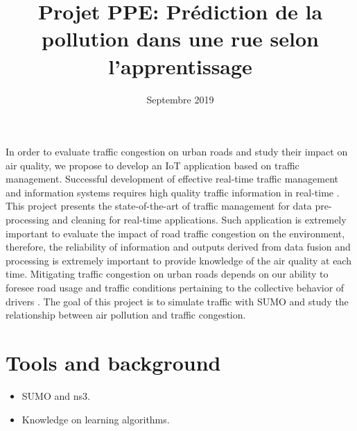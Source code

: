 \documentclass[a4paper]{article}
\title{\textbf{Projet PPE:} Prédiction de la pollution dans une rue selon l’apprentissage}
\date{Septembre 2019}
\begin{document}
\maketitle


In order to evaluate traffic congestion on urban roads and study their impact on air quality,
	we propose to develop an IoT application based on traffic management.
Successful development of effective real-time traffic management and information systems requires high quality traffic information in real-time \cite{lopes_traffic_2010}.
This project presents the state-of-the-art of traffic management for data pre-processing and cleaning for real-time applications.
Such application is extremely important to evaluate the impact of road traffic congestion on the environment,
	therefore,
	the reliability of information and outputs derived from data fusion and processing is extremely important to provide knowledge of the air quality at each time.
Mitigating traffic congestion on urban roads depends on our ability to foresee road usage and traffic conditions pertaining to the collective behavior of drivers \cite{wang_predictability_2015}.
The goal of this project is to simulate traffic with SUMO \cite{behrisch_sumo_2011} and study the relationship between air pollution and traffic congestion.


\section{Tools and background}

\begin{itemize}
	\item SUMO and ns3.
	\item Knowledge on learning algorithms.
\end{itemize}

\printbibliography


\end{document}
